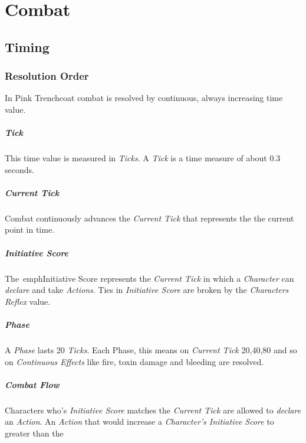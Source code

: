 \chapter{Combat}

\section{Timing}

\subsection{Resolution Order}

In Pink Trenchcoat combat is resolved by continuous, always increasing time value.

\paragraph{Tick}
This time value is measured in \emph{Ticks}. A \emph{Tick} is
a time measure of about 0.3 seconds.

\paragraph{Current Tick}
Combat continuously advances the \emph{Current Tick} that represents the the current
point in time.

\paragraph{Initiative Score}
The\ emph{Initiative Score} represents the \emph{Current Tick} in which a
\emph{Character} can \emph{declare} and take \emph{Actions}.
Ties in \emph{Initiative Score} are broken by the \emph{Characters Reflex} value.

\paragraph{Phase}
A \emph{Phase} lasts 20 \emph{Ticks}. Each Phase, this means on \emph{Current Tick }
20,40,80 and so on \emph{Continuous Effects} like fire,
toxin damage and bleeding are resolved.

\paragraph{Combat Flow}
\label{par:maximum initiative score}
Characters who's \emph{Initiative Score} matches the \emph{Current Tick}
are allowed to \emph{declare} an \emph{Action}. An \emph{Action} that would
increase a \emph{Character's Initiative Score} to greater than the

